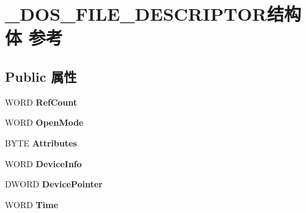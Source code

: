 \hypertarget{struct___d_o_s___f_i_l_e___d_e_s_c_r_i_p_t_o_r}{}\section{\+\_\+\+D\+O\+S\+\_\+\+F\+I\+L\+E\+\_\+\+D\+E\+S\+C\+R\+I\+P\+T\+O\+R结构体 参考}
\label{struct___d_o_s___f_i_l_e___d_e_s_c_r_i_p_t_o_r}
\subsection*{Public 属性}
\begin{DoxyCompactItemize}
\item 
\mbox{\label{struct___d_o_s___f_i_l_e___d_e_s_c_r_i_p_t_o_r_a647e1980f15d732303d615caf52c36ae}} 
W\+O\+RD {\bfseries Ref\+Count}
\item 
\mbox{\label{struct___d_o_s___f_i_l_e___d_e_s_c_r_i_p_t_o_r_ab8e60014045fde286300d202f3bdaa67}} 
W\+O\+RD {\bfseries Open\+Mode}
\item 
\mbox{\label{struct___d_o_s___f_i_l_e___d_e_s_c_r_i_p_t_o_r_abc25990d498a0077ca604c19548581d4}} 
B\+Y\+TE {\bfseries Attributes}
\item 
\mbox{\label{struct___d_o_s___f_i_l_e___d_e_s_c_r_i_p_t_o_r_a9d72ce08533c56f98ee8e317f026057f}} 
W\+O\+RD {\bfseries Device\+Info}
\item 
\mbox{\label{struct___d_o_s___f_i_l_e___d_e_s_c_r_i_p_t_o_r_a3d97388732d0dae13b3a9099d4e4da9b}} 
D\+W\+O\+RD {\bfseries Device\+Pointer}
\item 
\mbox{\label{struct___d_o_s___f_i_l_e___d_e_s_c_r_i_p_t_o_r_a2731bed451a19af64f807a1db75d98d3}} 
W\+O\+RD {\bfseries Time}
\item 
\mbox{\label{struct___d_o_s___f_i_l_e___d_e_s_c_r_i_p_t_o_r_a170c798d3387e2e88407647cfc630bb8}} 

\end{DoxyCompactItemize}

